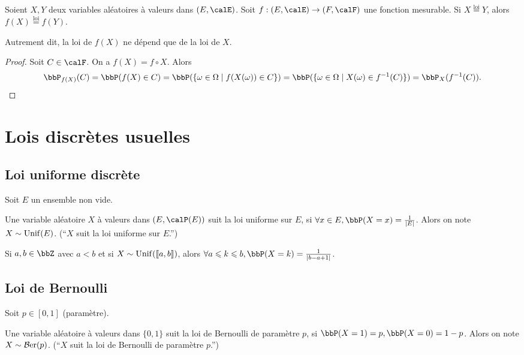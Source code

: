 \begin{prop}
    Soient $X, Y$ deux variables aléatoires à valeurs dans $(E, \calE)$.
    Soit $f: (E, \calE) \to (F, \calF)$ une fonction mesurable.
    Si $X \overset{\text{loi}}{=} Y$, alors $f(X) \overset{\text{loi}}{=} f(Y)$.
\end{prop}

\begin{rqq}
    Autrement dit, la loi de $f(X)$ ne dépend que de la loi de $X$.
\end{rqq}

\begin{proof}
    Soit $C \in \calF$. On a $f(X) = f \circ X$.
    Alors \[ \bbP_{f(X)}(C) = \bbP(f(X) \in C) = \bbP(\{ \omega \in \Omega \mid f(X(\omega)) \in C \})
        = \bbP(\{ \omega \in \Omega \mid X(\omega) \in f^{-1}(C) \})
        = \bbP_X(f^{-1}(C)). \qedhere \]
\end{proof}

\section{Lois discrètes usuelles}

\subsection{Loi uniforme discrète}

Soit $E$ un ensemble non vide.

\begin{deff}
    Une variable aléatoire $X$ à valeurs dans $(E, \calP(E))$ suit la loi uniforme sur $E$,
    si $\forall x \in E, \bbP(X = x) = \frac{1}{\lrvert{E}}$.
    Alors on note $X \sim \operatorname{Unif}(E)$. (``$X$ suit la loi uniforme sur $E$.'')
\end{deff}

\begin{exem}
    Si $a, b \in \bbZ$ avec $a < b$ et si $X \sim \operatorname{Unif}(\llbracket a, b \rrbracket)$,
    alors $\forall a \leqslant k \leqslant b, \bbP(X = k) = \frac{1}{\lrvert{b - a + 1}}$.
\end{exem}

\subsection{Loi de Bernoulli}

Soit $p \in [0, 1]$ (paramètre).

\begin{deff}
    Une variable aléatoire à valeurs dans $\{ 0, 1 \}$ suit la loi de Bernoulli de paramètre $p$,
    si $\bbP(X = 1) = p, \bbP(X = 0) = 1 - p$.
    Alors on note $X \sim \operatorname{\mathcal{B}er}(p)$. (``$X$ suit la loi de Bernoulli de paramètre $p$.'')
\end{deff}


